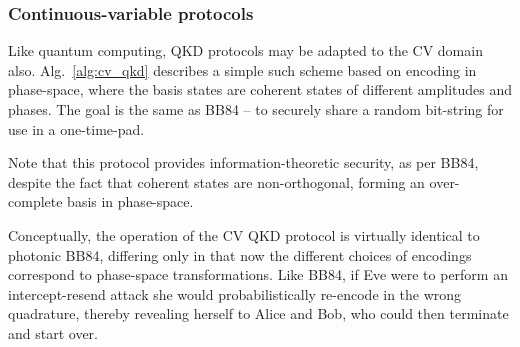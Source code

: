 \subsubsection{Continuous-variable protocols}\label{sec:CV_QKD}


Like quantum computing, QKD protocols may be adapted to the CV domain also. Alg.~\ref{alg:cv_qkd} describes a simple such scheme based on encoding in phase-space, where the basis states are coherent states of different amplitudes and phases. The goal is the same as BB84 -- to securely share a random bit-string for use in a one-time-pad.

Note that this protocol provides information-theoretic security, as per BB84, despite the fact that coherent states are non-orthogonal, forming an over-complete basis in phase-space.

Conceptually, the operation of the CV QKD protocol is virtually identical to photonic BB84, differing only in that now the different choices of encodings correspond to phase-space transformations. Like BB84, if Eve were to perform an intercept-resend attack she would probabilistically re-encode in the wrong quadrature, thereby revealing herself to Alice and Bob, who could then terminate and start over. 

